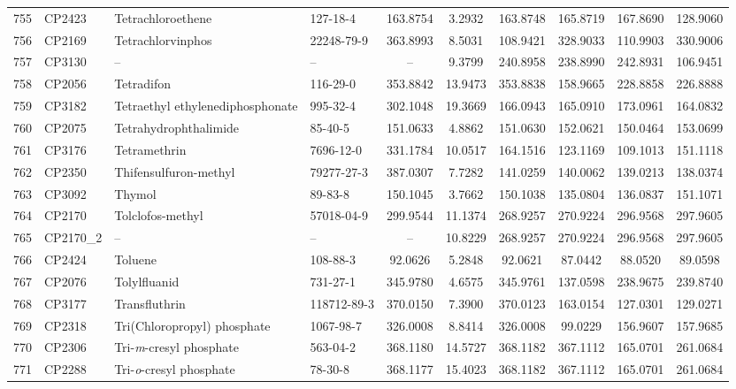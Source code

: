 \begin{longtable}{clllcccccc}
755 & CP2423 & Tetrachloroethene & 127-18-4 & 163.8754 & 3.2932 & 163.8748 & 165.8719 & 167.8690 & 128.9060 \\ 
756 & CP2169 & Tetrachlorvinphos & 22248-79-9 & 363.8993 & 8.5031 & 108.9421 & 328.9033 & 110.9903 & 330.9006 \\ 
757 & CP3130 & – & – & – & 9.3799 & 240.8958 & 238.8990 & 242.8931 & 106.9451 \\ 
758 & CP2056 & Tetradifon & 116-29-0 & 353.8842 & 13.9473 & 353.8838 & 158.9665 & 228.8858 & 226.8888 \\ 
759 & CP3182 & Tetraethyl ethylenediphosphonate\smash{\textsuperscript{\textdaggerdbl}} & 995-32-4 & 302.1048 & 19.3669 & 166.0943 & 165.0910 & 173.0961 & 164.0832 \\ 
760 & CP2075 & Tetrahydrophthalimide\smash{\textsuperscript{\textdaggerdbl}} & 85-40-5 & 151.0633 & 4.8862 & 151.0630 & 152.0621 & 150.0464 & 153.0699 \\ 
761 & CP3176 & Tetramethrin & 7696-12-0 & 331.1784 & 10.0517 & 164.1516 & 123.1169 & 109.1013 & 151.1118 \\ 
762 & CP2350 & Thifensulfuron-methyl & 79277-27-3 & 387.0307 & 7.7282 & 141.0259 & 140.0062 & 139.0213 & 138.0374 \\ 
763 & CP3092 & Thymol & 89-83-8 & 150.1045 & 3.7662 & 150.1038 & 135.0804 & 136.0837 & 151.1071 \\ 
764 & CP2170 & Tolclofos-methyl & 57018-04-9 & 299.9544 & 11.1374 & 268.9257 & 270.9224 & 296.9568 & 297.9605 \\ 
765 & CP2170\_2 & – & – & – & 10.8229 & 268.9257 & 270.9224 & 296.9568 & 297.9605 \\ 
766 & CP2424 & Toluene & 108-88-3 & 92.0626 & 5.2848 & 92.0621 & 87.0442 & 88.0520 & 89.0598 \\ 
767 & CP2076 & Tolylfluanid & 731-27-1 & 345.9780 & 4.6575 & 345.9761 & 137.0598 & 238.9675 & 239.8740 \\ 
768 & CP3177 & Transfluthrin & 118712-89-3 & 370.0150 & 7.3900 & 370.0123 & 163.0154 & 127.0301 & 129.0271 \\ 
769 & CP2318 & Tri(Chloropropyl) phosphate & 1067-98-7 & 326.0008 & 8.8414 & 326.0008 & 99.0229 & 156.9607 & 157.9685 \\ 
770 & CP2306 & Tri-\textit{m}-cresyl phosphate & 563-04-2 & 368.1180 & 14.5727 & 368.1182 & 367.1112 & 165.0701 & 261.0684 \\ 
771 & CP2288 & Tri-\textit{o}-cresyl phosphate & 78-30-8 & 368.1177 & 15.4023 & 368.1182 & 367.1112 & 165.0701 & 261.0684 \\ 

\end{longtable}
